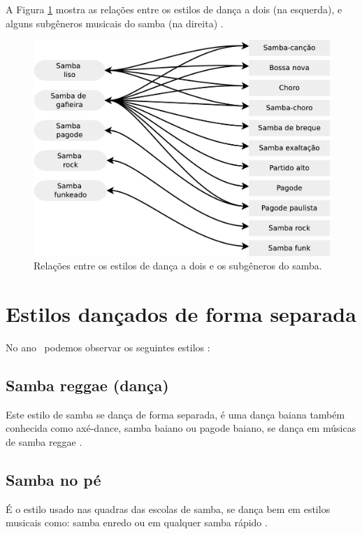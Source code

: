 A Figura \ref{fig:sambadavavsmusica} mostra as relações entre os estilos de dança a dois (na esquerda),
 e alguns subgêneros musicais do samba (na direita) \cite[pp. 134-138]{perna2002samba}.

\begin{figure}[h]
  \centering
    \includegraphics[width=1.0\textwidth]{chapters/cap-historia-dancasamba/dancavcmusica.eps}
  \caption{Relações entre os estilos de dança a dois e os subgêneros do samba.}
\label{fig:sambadavavsmusica}
\end{figure}

\section{Estilos dançados de forma separada}
No ano \AnoLivro~podemos observar os seguintes estilos \cite[pp. 134]{perna2002samba}:

\subsection{Samba reggae  (dança)} 
Este estilo de samba se dança de forma separada, 
é uma dança baiana também conhecida como axé-dance, samba baiano ou pagode baiano,
se dança em músicas de samba reggae \cite[pp. 134]{perna2002samba}.

\subsection{Samba no pé} 
É o estilo usado nas quadras das escolas de samba,
se dança bem em estilos musicais como: 
samba enredo ou em qualquer samba rápido  \cite[pp. 134]{perna2002samba}.

